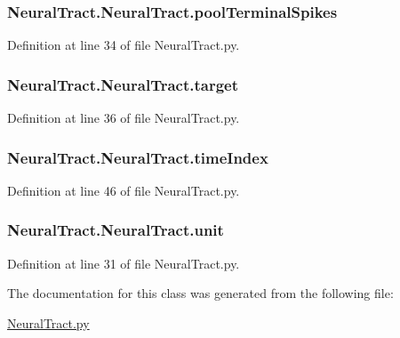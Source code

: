 \subsubsection[{\texorpdfstring{pool\+Terminal\+Spikes}{poolTerminalSpikes}}]{\setlength{\rightskip}{0pt plus 5cm}Neural\+Tract.\+Neural\+Tract.\+pool\+Terminal\+Spikes}\hypertarget{class_neural_tract_1_1_neural_tract_a1d104906ff30028e44e377a9e1ed5a3d}{}\label{class_neural_tract_1_1_neural_tract_a1d104906ff30028e44e377a9e1ed5a3d}


Definition at line 34 of file Neural\+Tract.\+py.

\subsubsection[{\texorpdfstring{target}{target}}]{\setlength{\rightskip}{0pt plus 5cm}Neural\+Tract.\+Neural\+Tract.\+target}\hypertarget{class_neural_tract_1_1_neural_tract_a637995fcac5bdd80ab1a9d4ea3de7f40}{}\label{class_neural_tract_1_1_neural_tract_a637995fcac5bdd80ab1a9d4ea3de7f40}


Definition at line 36 of file Neural\+Tract.\+py.

\subsubsection[{\texorpdfstring{time\+Index}{timeIndex}}]{\setlength{\rightskip}{0pt plus 5cm}Neural\+Tract.\+Neural\+Tract.\+time\+Index}\hypertarget{class_neural_tract_1_1_neural_tract_adcda2b95aa86d4e7eebcc2557aee58cf}{}\label{class_neural_tract_1_1_neural_tract_adcda2b95aa86d4e7eebcc2557aee58cf}


Definition at line 46 of file Neural\+Tract.\+py.

\subsubsection[{\texorpdfstring{unit}{unit}}]{\setlength{\rightskip}{0pt plus 5cm}Neural\+Tract.\+Neural\+Tract.\+unit}\hypertarget{class_neural_tract_1_1_neural_tract_a95db7d0720ec12f091758968476ba240}{}\label{class_neural_tract_1_1_neural_tract_a95db7d0720ec12f091758968476ba240}


Definition at line 31 of file Neural\+Tract.\+py.



The documentation for this class was generated from the following file\+:\begin{DoxyCompactItemize}
\item 
\hyperlink{_neural_tract_8py}{Neural\+Tract.\+py}\end{DoxyCompactItemize}

